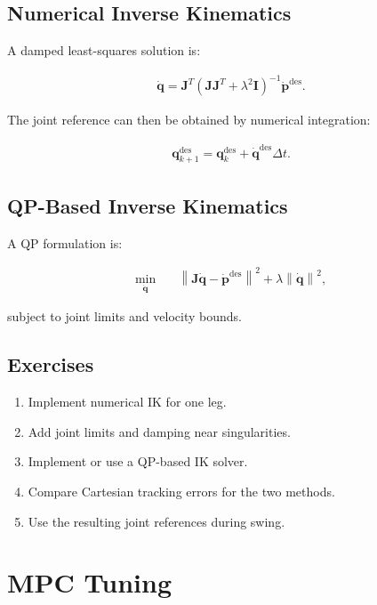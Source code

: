 \documentclass[11pt,a4paper]{article}
\begin{document}
\subsection{Numerical Inverse Kinematics}

A damped least-squares solution is:

\begin{align*}
\dot{\bm{q}} =
\bm{J}^{T}
\left(
\bm{J}\bm{J}^{T}+\lambda^2\bm{I}
\right)^{-1}
\dot{\bm{p}}^{\mathrm{des}}.
\end{align*}

The joint reference can then be obtained by numerical integration:

\begin{align*}
\bm{q}_{k+1}^{\mathrm{des}}
=
\bm{q}_k^{\mathrm{des}}
+
\dot{\bm{q}}^{\mathrm{des}} \Delta t.
\end{align*}

\subsection{QP-Based Inverse Kinematics}

A QP formulation is:

\begin{align*}
\min_{\dot{\bm{q}}}
\quad &
\left\|
\bm{J}\dot{\bm{q}}-\dot{\bm{p}}^{\mathrm{des}}
\right\|^2
+
\lambda
\left\|
\dot{\bm{q}}
\right\|^2,
\end{align*}

subject to joint limits and velocity bounds.

\subsection*{Exercises}

\begin{enumerate}[label=\arabic*.]
    \item Implement numerical IK for one leg.
    \item Add joint limits and damping near singularities.
    \item Implement or use a QP-based IK solver.
    \item Compare Cartesian tracking errors for the two methods.
    \item Use the resulting joint references during swing.
\end{enumerate}


\section{MPC Tuning}
\end{document}
